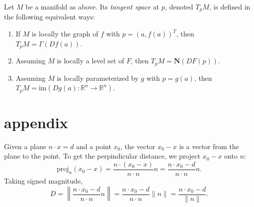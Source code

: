 \documentclass[12pt]{article}
\begin{document}
\begin{definition}
	Let $M$ be a manifold as above. Its \emph{tangent space} at $p$, denoted $T_pM$, is defined in the following equivalent ways: 
	\begin{enumerate}
		\item If $M$ is locally the graph of $f$ with $p=(a, f(a))^T$, then $T_pM=\Gamma(Df(a))$.
		\item Assuming $M$ is locally a level set of $F$, then $T_pM=\mathbf{N}(DF(p))$.
		\item Assuming $M$ is locally parameterized by $g$ with $p=g(a)$, then $T_pM=\text{im}(Dg(a):\mathbb{R}^n\to\mathbb{R}^n)$.
	\end{enumerate}
\end{definition}



\section{appendix} %

Given a plane $n\cdot x=d$ and a point $x_0$, the vector $x_0-x$ is a vector from the plane to the point. To get the perpindicular distance, we project $x_0-x$ onto $n$:
\begin{equation*}
	\text{proj}_n(x_0-x)=\frac{n\cdot (x_0-x)}{n\cdot n}n = \frac{n\cdot x_0-d}{n\cdot n}n.
\end{equation*}
Taking signed magnitude, 
\begin{equation*}
	D = \left\| \frac{n\cdot x_0-d}{n\cdot n}n\right\| = \frac{n\cdot x_0-d}{n\cdot n}\|n\|=\frac{n\cdot x_0-d}{\|n\|}.
\end{equation*}

\end{document}
